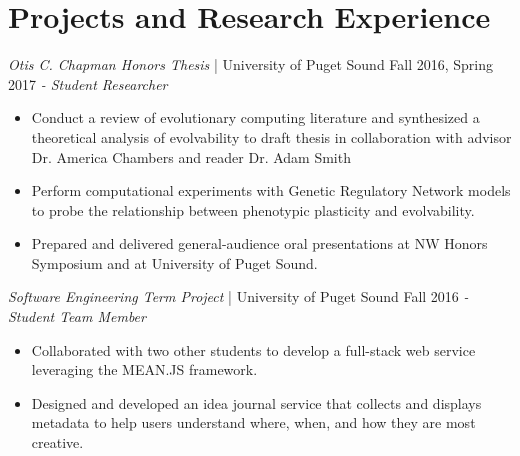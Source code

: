 \section{Projects and Research Experience}

\textit{Otis C. Chapman Honors Thesis} | University of Puget Sound \hfill Fall 2016, Spring 2017 \newline
\textit{- Student Researcher} \\
  \vspace{-4.5mm}
 \begin{itemize}
 \item Conduct a review of evolutionary computing literature and synthesized a theoretical analysis of evolvability to draft thesis in collaboration with advisor Dr. America Chambers and reader Dr. Adam Smith
 \item Perform computational experiments with Genetic Regulatory Network models to probe the relationship between phenotypic plasticity and evolvability.
 \item Prepared and delivered general-audience oral presentations at NW Honors Symposium and at University of Puget Sound.
 \end{itemize}
  \vspace{-3.5mm}
  
\textit{Software Engineering Term Project} | University of Puget Sound \hfill Fall 2016 \newline
\textit{- Student Team Member} \\
  \vspace{-4.5mm}
 \begin{itemize}
 \item Collaborated with two other students to develop a full-stack web service leveraging the MEAN.JS framework.
 \item Designed and developed an idea journal service that collects and displays metadata to help users understand where, when, and how they are most creative.
 \end{itemize}
  \vspace{-3.5mm}


